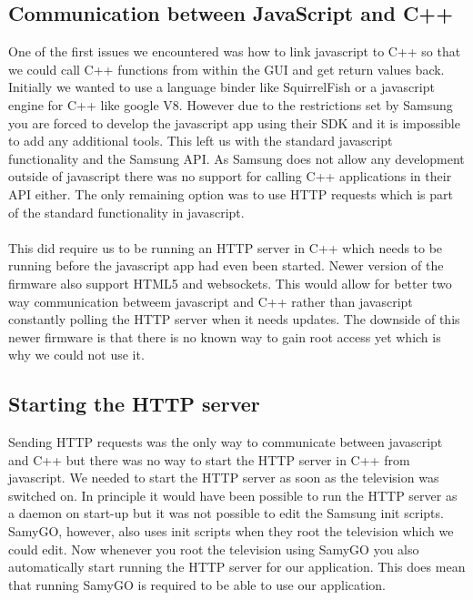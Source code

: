 \subsection{Communication between JavaScript and C++}
One of the first issues we encountered was how to link javascript to C++ so that we could call C++ functions from within the GUI and get return values back. Initially we wanted to use a language binder like SquirrelFish or a javascript engine for C++ like google V8. However due to the restrictions set by Samsung you are forced to develop the javascript app using their SDK and it is impossible to add any additional tools. This left us with the standard javascript functionality and the Samsung API. As Samsung does not allow any development outside of javascript there was no support for calling C++ applications in their API either. The only remaining option was to use HTTP requests which is part of the standard functionality in javascript.
\\\\
This did require us to be running an HTTP server in C++ which needs to be running before the javascript app had even been started. Newer version of the firmware also support HTML5 and websockets. This would allow for better two way communication betweem javascript and C++ rather than javascript constantly polling the HTTP server when it needs updates. The downside of this newer firmware is that there is no known way to gain root access yet which is why we could not use it.

\subsection{Starting the HTTP server}

Sending HTTP requests was the only way to communicate between javascript and C++ but there was no way to start the HTTP server in C++ from javascript. We needed to start the HTTP server as soon as the television was switched on. In principle it would have been possible to run the HTTP server as a daemon on start-up but it was not possible to edit the Samsung init scripts. SamyGO, however, also uses init scripts when they root the television which we could edit. Now whenever you root the television using SamyGO you also automatically start running the HTTP server for our application. This does mean that running SamyGO is required to be able to use our application.
